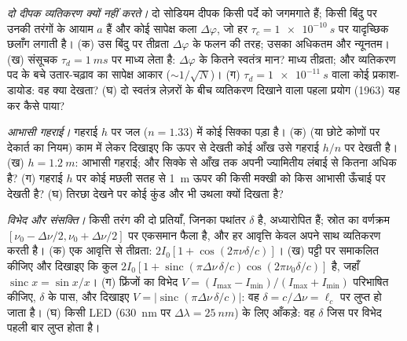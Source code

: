 \begin{exercise}[$\star\star$]\label{exo:b2:scalar-light-model:8}
\emph{दो दीपक व्यतिकरण क्यों नहीं करते।} दो सोडियम दीपक किसी पर्दे को
जगमगाते हैं; किसी बिंदु पर उनकी तरंगों के आयाम $a$ हैं और कोई सापेक्ष
कला $\Delta\varphi$, जो हर $\tau_c = \qty{1e-10}{s}$ पर यादृच्छिक छलाँग लगाती है। (क)
उस बिंदु पर तीव्रता $\Delta\varphi$ के फलन की तरह; उसका अधिकतम और
न्यूनतम। (ख) संसूचक $\tau_d = \qty{1}{ms}$ पर माध्य लेता है: $\Delta\varphi$ के कितने
स्वतंत्र मान? माध्य तीव्रता; और व्यतिकरण पद के बचे उतार-चढ़ाव
का सापेक्ष आकार ($\sim 1/\sqrt N$)। (ग) $\tau_d = \qty{1e-11}{s}$ वाला कोई
प्रकाश-डायोड: वह क्या देखता? (घ) दो स्वतंत्र लेज़रों के बीच
व्यतिकरण दिखाने वाला पहला प्रयोग (1963) यह कर कैसे पाया?
\end{exercise}

\begin{exercise}[$\star\star$]\label{exo:b2:scalar-light-model:9}
\emph{आभासी गहराई।} गहराई $h$ पर जल ($n = 1.33$) में कोई सिक्का पड़ा है।
(क)  (या छोटे कोणों पर देकार्त का नियम) काम में लेकर दिखाइए
कि ऊपर से देखती कोई आँख उसे गहराई $h/n$ पर देखती है। (ख) $h = \qty{1.2}{m}$: आभासी
गहराई; और सिक्के से आँख तक  अपनी ज्यामितीय लंबाई से
कितना अधिक है? (ग) गहराई $h$ पर कोई मछली सतह से \qty{1}{m} ऊपर की किसी मक्खी को
किस आभासी ऊँचाई पर देखती है? (घ) तिरछा देखने पर कोई कुंड और भी
उथला क्यों दिखता है?
\end{exercise}

\begin{exercise}[$\star\star\star$]\label{exo:b2:scalar-light-model:10}
\emph{विभेद और संसक्ति।} किसी तरंग की दो प्रतियाँ, जिनका पथांतर
$\delta$ है, अध्यारोपित हैं; स्रोत का वर्णक्रम
$[\nu_0 - \Delta\nu/2, \nu_0 + \Delta\nu/2]$ पर एकसमान फैला है, और हर आवृत्ति केवल
अपने साथ व्यतिकरण करती है। (क) एक आवृत्ति से तीव्रता: $2I_0
[1 + \cos(2\pi\nu\delta/c)]$। (ख) पट्टी पर समाकलित कीजिए और दिखाइए कि
कुल $2I_0[1 + \operatorname{sinc}(\pi\Delta\nu\,\delta/c)\cos(2\pi\nu_0\delta/c)]$ है, जहाँ
$\operatorname{sinc}x = \sin x/x$। (ग) फ्रिंजों का विभेद $V = (I_{\max} -
I_{\min})/(I_{\max} + I_{\min})$ परिभाषित कीजिए, $\delta$ के पास, और दिखाइए $V =
|\operatorname{sinc}(\pi\Delta\nu\,\delta/c)|$: वह $\delta = c/\Delta\nu = \ell_c$ पर लुप्त हो जाता है। (घ)
किसी LED (\qty{630}{nm} पर $\Delta\lambda = \qty{25}{nm}$) के लिए आँकड़े: वह $\delta$ जिस पर
विभेद पहली बार लुप्त होता है।
\end{exercise}

